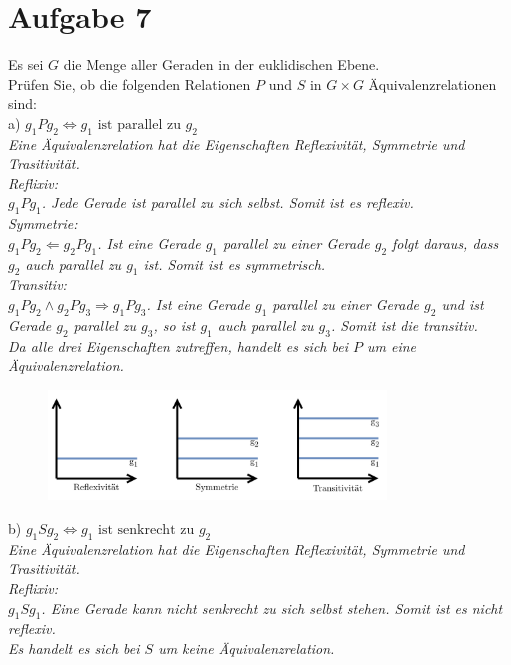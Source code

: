 \section*{Aufgabe 7}

Es sei $G$ die Menge aller Geraden in der euklidischen Ebene.\\
Prüfen Sie, ob die folgenden Relationen $P$ und $S$ in $G \times G$ Äquivalenzrelationen sind:\\

a) $g_1 P g_2 \Leftrightarrow g_1 \text{ ist parallel zu } g_2$\\

\textit{Eine Äquivalenzrelation hat die Eigenschaften Reflexivität, Symmetrie und Trasitivität.}\\

\textit{Reflixiv:}\\
\textit{$g_1Pg_1$. Jede Gerade ist parallel zu sich selbst. Somit ist es reflexiv.}\\

\textit{Symmetrie:}\\
\textit{$g_1Pg_2 \Leftarrow g_2Pg_1$. Ist eine Gerade $g_1$ parallel zu einer Gerade $g_2$ folgt daraus, dass $g_2$ auch parallel zu $g_1$ ist. Somit ist es symmetrisch.}\\

\textit{Transitiv:}\\
\textit{$g_1Pg_2 \land g_2Pg_3 \Rightarrow g_1Pg_3$. Ist eine Gerade $g_1$ parallel zu einer Gerade $g_2$ und ist Gerade $g_2$ parallel zu $g_3$, so ist $g_1$ auch parallel zu $g_3$. Somit ist die transitiv.}\\

\textit{Da alle drei Eigenschaften zutreffen, handelt es sich bei $P$ um eine Äquivalenzrelation.}

\begin{figure}[h]
\centering
\includegraphics[width=0.8\textwidth]{graphics/parallel.png}
\end{figure}

b) $g_1 S g_2 \Leftrightarrow g_1 \text{ ist senkrecht zu } g_2$\\

\textit{Eine Äquivalenzrelation hat die Eigenschaften Reflexivität, Symmetrie und Trasitivität.}\\

\textit{Reflixiv:}\\
\textit{$g_1Sg_1$. Eine Gerade kann nicht senkrecht zu sich selbst stehen. Somit ist es nicht reflexiv.}\\

\textit{Es handelt es sich bei $S$ um keine Äquivalenzrelation.}

